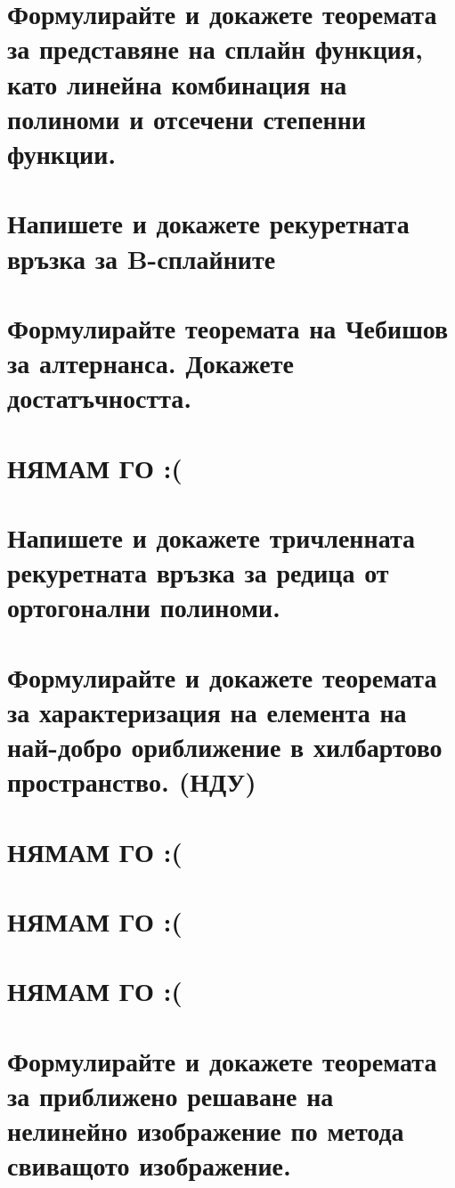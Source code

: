 \documentclass[a4paper, 12pt, oneside]{article}
\begin{document}
\section{Формулирайте и докажете теоремата за представяне на сплайн функция,
като линейна комбинация на полиноми и отсечени степенни функции.}

\section{Напишете и докажете рекуретната връзка за B-сплайните}

\section{Формулирайте теоремата на Чебишов за алтернанса. Докажете достатъчността.}

\section{НЯМАМ ГО :(}

\section{Напишете и докажете тричленната рекуретната връзка за редица от ортогонални полиноми.}

\section{Формулирайте и докажете теоремата за характеризация на елемента на най-добро ориближение в хилбартово пространство. (НДУ)}

\section{НЯМАМ ГО :(}

\section{НЯМАМ ГО :(}

\section{НЯМАМ ГО :(}

\section{Формулирайте и докажете теоремата за приближено решаване
на нелинейно изображение по метода свиващото изображение.}
\end{document}

